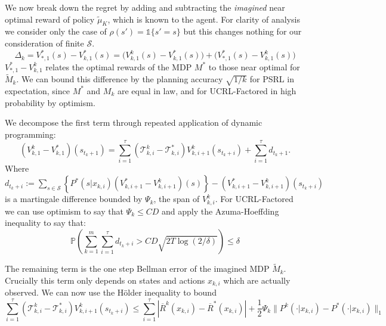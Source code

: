 \documentclass{article}
\newcommand{\Exp}{\mathds{E}}
\newcommand{\Prob}{\mathds{P}}
\newcommand{\Ind}{\mathds{1}}
\newcommand{\Sc}{\mathcal{S}}
\newcommand{\Mc}{\mathcal{M}}
\newcommand{\Tc}{\mathcal{T}}
\begin{document}
We now break down the regret by adding and subtracting the \emph{imagined} near optimal reward of policy $\tilde{\mu}_K$, which is known to the agent.
For clarity of analysis we consider only the case of $\rho(s') = \Ind \{s' = s \}$ but this changes nothing for our consideration of finite $\Sc$.
\begin{equation}
	\Delta_k =  V^*_{*,1}(s) - V^*_{k,1}(s) = \bigg( V^k_{k,1}(s) - V^*_{k,1}(s) \bigg) + \bigg(V^*_{*,1}(s) - V^k_{k,1}(s) \bigg)
\end{equation}
$V^*_{*,1} - V^k_{k,1}$ relates the optimal rewards of the MDP $M^*$ to those near optimal for $\tilde{M}_k$.
We can bound this difference by the planning accuracy $\sqrt{1/k}$ for PSRL in expectation, since $M^*$ and $M_k$ are equal in law, and for UCRL-Factored in high probability by optimism.

We decompose the first term through repeated application of dynamic programming:
\begin{equation}
	\left(V^k_{k,1} - V^*_{k,1} \right) (s_{t_k+1}) = \sum_{i=1}^\tau \left( \Tc^k_{k,i} - \Tc^*_{k,i} \right) V^k_{k,i+1}(s_{t_k+i}) + \sum_{i=1}^\tau d_{t_k+1}.
\end{equation}
Where $d_{t_k+i} := \sum_{s \in \Sc} \left\{ P^*(s | x_{k,i}) (V^*_{k,i+1}-V^k_{k,i+1})(s) \right\} - (V^*_{k,i+1} - V^k_{k,i+1})(s_{t_k+i})$
is a martingale difference bounded by $\Psi_k$, the span of $V^k_{k,i}$.
For UCRL-Factored we can use optimism to say that $\Psi_k \le CD$ \cite{jaksch2010near} and apply the Azuma-Hoeffding inequality to say that:
\begin{equation}
\label{eq: d_t}
	\Prob \left( \sum_{k=1}^m \sum_{i=1}^\tau d_{t_k+i} > CD\sqrt{2T\log(2/\delta)} \right) \le \delta
\end{equation}

The remaining term is the one step Bellman error of the imagined MDP $\tilde{M}_k$.
Crucially this term only depends on states and actions $x_{k,i}$ which are actually observed.
We can now use the H\"{o}lder inequality to bound
\begin{equation}
\label{eq: err sums}
	\sum_{i=1}^\tau \left( \Tc^k_{k,i} - \Tc^*_{k,i} \right) V^k_{k,i+1}(s_{t_k+i}) \le
		\sum_{i=1}^\tau |\overline{R}^k(x_{k,i}) - \overline{R}^*(x_{k,i}) | + \frac{1}{2} \Psi_k \|P^k(\cdot|x_{k,i}) - P^*(\cdot|x_{k,i}) \|_1
\end{equation}
\end{document}
